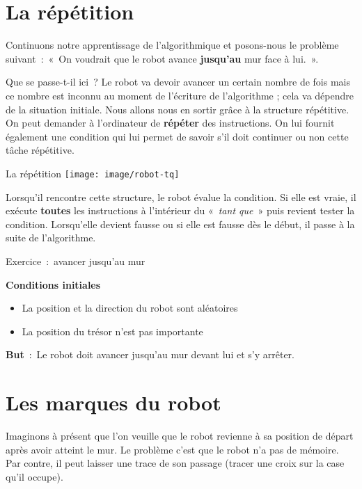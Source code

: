 \section{La répétition}

	Continuons notre apprentissage de l’algorithmique et
	posons-nous le problème suivant~:~«~On voudrait que le robot avance
	\textbf{jusqu’au} mur face à lui.~».
	
	Que se passe-t-il ici~? Le robot va devoir avancer un certain nombre de
	fois mais ce nombre est inconnu au moment de
	l’écriture de l’algorithme ; cela va
	dépendre de la situation initiale. Nous allons nous en sortir grâce à
	la structure répétitive. On peut demander à
	l’ordinateur de \textbf{répéter} des instructions. On
	lui fournit également une condition qui lui permet de savoir
	s’il doit continuer ou non cette tâche répétitive.

	
	\begin{Emphase}[definition]{La répétition}
	\texttt{[image: image/robot-tq]}
	\end{Emphase}

	Lorsqu’il rencontre cette structure, le robot évalue la
	condition. Si elle est vraie, il exécute \textbf{toutes} les
	instructions à l’intérieur du «~\textit{tant que~}»
	puis revient tester la condition. Lorsqu’elle devient
	fausse ou si elle est fausse dès le début, il passe à la suite de
	l’algorithme.
	
	\begin{Emphase}[exercice]{Exercice~:~avancer jusqu’au mur}

		\textbf{Conditions initiales}

		\begin{itemize}
		\item La position et la direction du robot sont aléatoires
		\item La position du trésor n’est pas importante
		\end{itemize}
		
		\textbf{But}~:~Le robot doit avancer jusqu’au mur
		devant lui et s’y arrêter.

	\end{Emphase}

\section{Les marques du robot}

	Imaginons à présent que l’on veuille que le robot
	revienne à sa position de départ après avoir atteint le mur. Le
	problème c’est que le robot n’a pas
	de mémoire. Par contre, il peut laisser une trace de son passage
	(tracer une croix sur la case qu’il occupe).
	
